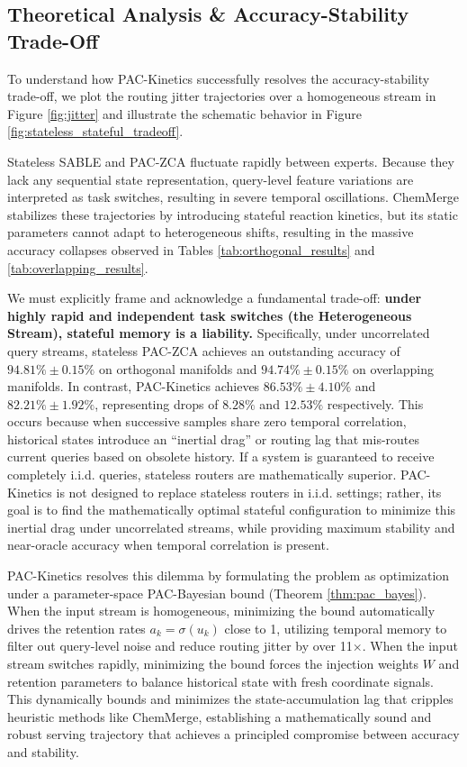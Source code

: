 \subsection{Theoretical Analysis \& Accuracy-Stability Trade-Off}
\label{sec:trade_off_analysis}

To understand how PAC-Kinetics successfully resolves the accuracy-stability trade-off, we plot the routing jitter trajectories over a homogeneous stream in Figure \ref{fig:jitter} and illustrate the schematic behavior in Figure \ref{fig:stateless_stateful_tradeoff}. 

Stateless SABLE and PAC-ZCA fluctuate rapidly between experts. Because they lack any sequential state representation, query-level feature variations are interpreted as task switches, resulting in severe temporal oscillations. ChemMerge stabilizes these trajectories by introducing stateful reaction kinetics, but its static parameters cannot adapt to heterogeneous shifts, resulting in the massive accuracy collapses observed in Tables \ref{tab:orthogonal_results} and \ref{tab:overlapping_results}.

We must explicitly frame and acknowledge a fundamental trade-off: \textbf{under highly rapid and independent task switches (the Heterogeneous Stream), stateful memory is a liability.} Specifically, under uncorrelated query streams, stateless PAC-ZCA achieves an outstanding accuracy of $94.81\% \pm 0.15\%$ on orthogonal manifolds and $94.74\% \pm 0.15\%$ on overlapping manifolds. In contrast, PAC-Kinetics achieves $86.53\% \pm 4.10\%$ and $82.21\% \pm 1.92\%$, representing drops of $8.28\%$ and $12.53\%$ respectively. This occurs because when successive samples share zero temporal correlation, historical states introduce an ``inertial drag'' or routing lag that mis-routes current queries based on obsolete history. If a system is guaranteed to receive completely i.i.d. queries, stateless routers are mathematically superior. PAC-Kinetics is not designed to replace stateless routers in i.i.d. settings; rather, its goal is to find the mathematically optimal stateful configuration to minimize this inertial drag under uncorrelated streams, while providing maximum stability and near-oracle accuracy when temporal correlation is present.

PAC-Kinetics resolves this dilemma by formulating the problem as optimization under a parameter-space PAC-Bayesian bound (Theorem \ref{thm:pac_bayes}). When the input stream is homogeneous, minimizing the bound automatically drives the retention rates $a_k = \sigma(u_k)$ close to 1, utilizing temporal memory to filter out query-level noise and reduce routing jitter by over 11$\times$. When the input stream switches rapidly, minimizing the bound forces the injection weights $W$ and retention parameters to balance historical state with fresh coordinate signals. This dynamically bounds and minimizes the state-accumulation lag that cripples heuristic methods like ChemMerge, establishing a mathematically sound and robust serving trajectory that achieves a principled compromise between accuracy and stability.

